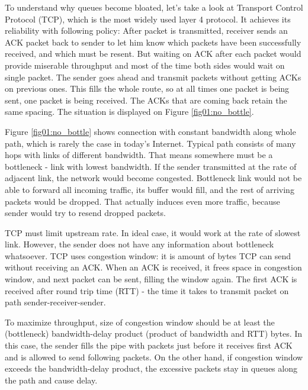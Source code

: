 To understand why queues become bloated, let's take a look at Transport Control Protocol (TCP), which is the most widely used layer 4 protocol. It achieves its reliability with following policy: After packet is transmitted, receiver sends an ACK packet back to sender to let him know which packets have been successfully received, and which must be resent. But waiting on ACK after each packet would provide miserable throughput and most of the time both sides would wait on single packet. The sender goes ahead and transmit packets without getting ACKs on previous ones. This fills the whole route, so at all times one packet is being sent, one packet is being received. The ACKs that are coming back retain the same spacing. The situation is displayed on Figure \ref{fig01:no_bottle}.

Figure \ref{fig01:no_bottle} shows connection with constant bandwidth along whole path, which is rarely the case in today's Internet. Typical path consists of many hops with links of different bandwidth. That means somewhere must be a bottleneck - link with lowest bandwidth. If the sender transmitted at the rate of adjacent link, the network would become congested. Bottleneck link would not be able to forward all incoming traffic, its buffer would fill, and the rest of arriving packets would be dropped. That actually induces even more traffic, because sender would try to resend dropped packets.


TCP must limit upstream rate. In ideal case, it would work at the rate of slowest link. However, the sender does not have any information about bottleneck whatsoever. TCP uses congestion window: it is amount of bytes TCP can send without receiving an ACK. When an ACK is received, it frees space in congestion window, and next packet can be sent, filling the window again. The first ACK is received after round trip time (RTT) - the time it takes to transmit packet on path sender-receiver-sender.

To maximize throughput, size of congestion window should be at least the (bottleneck) bandwidth-delay product (product of bandwidth and RTT) bytes. In this case, the sender fills the pipe with packets just before it receives first ACK and is allowed to send following packets. On the other hand, if congestion window exceeds the bandwidth-delay product, the excessive packets stay in queues along the path and cause delay. 





